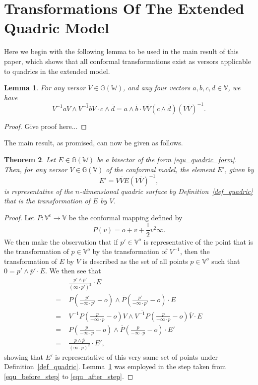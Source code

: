 \documentclass{birkjour}
\newtheorem{thm}{Theorem}[section]
\newtheorem{lem}[thm]{Lemma}
\theoremstyle{definition}
\theoremstyle{remark}
\numberwithin{equation}{section}
\newcommand{\G}{\mathbb{G}}
\newcommand{\V}{\mathbb{V}}
\newcommand{\W}{\mathbb{W}}
\newcommand{\nvao}{o}
\newcommand{\nvai}{\infty}
\begin{document}
\section{Transformations Of The Extended Quadric Model}

Here we begin with the following lemma to be used in the main result
of this paper, which shows that all conformal transformations exist
as versors applicable to quadrics in the extended model.
\begin{lem}\label{lma_versor_transfer}
For any versor $V\in\G(\W)$, and any four vectors $a,b,c,d\in\V$, we have
\begin{equation}
V^{-1}aV\wedge\overline{V^{-1}bV}\cdot c\wedge\overline{d} =
a\wedge\overline{b}\cdot V\overline{V}(c\wedge\overline{d})(V\overline{V})^{-1}.
\end{equation}
\end{lem}
\begin{proof}
Give proof here...
\end{proof}
The main result, as promised, can now be given as follows.
\begin{thm}
Let $E\in\G(\W)$ be a bivector of the form \eqref{equ_quadric_form}.
Then, for any versor $V\in\G(\V)$ of the conformal model, the element $E'$, given by
\begin{equation}
E' = V\overline{V}E(V\overline{V})^{-1},
\end{equation}
is representative of the $n$-dimensional quadric surface by Definition~\ref{def_quadric}
that is the transformation of $E$ by $V$.
\end{thm}
\begin{proof}
Let $P:\V^e\to\V$ be the conformal mapping defined by
\begin{equation}
P(v) = \nvao + v + \frac{1}{2}v^2\nvai.
\end{equation}
We then make the observation that if $p'\in\V^o$ is representative of
the point that is the transformation of $p\in\V^o$ by the transformation
of $V^{-1}$, then the transformation of $E$ by $V$ is described as the set of
all points $p\in\V^o$ such that $0=p'\wedge\overline{p}'\cdot E$.
We then see that
\begin{align}
 & \frac{p'\wedge\overline{p}'}{(\nvai\cdot p')^2}\cdot E \\
=\;& P\left(\frac{p'}{-\nvai\cdot p'}-\nvao\right)
\wedge\overline{P}\left(\frac{p'}{-\nvai\cdot p'}-\nvao\right)\cdot E \\
=\;& V^{-1}P\left(\frac{p}{-\nvai\cdot p}-\nvao\right)V
\wedge\overline{V^{-1}P}\left(\frac{p}{-\nvai\cdot p}-\nvao\right)\overline{V}\cdot E\label{equ_before_step} \\
=\;& P\left(\frac{p}{-\nvai\cdot p}-\nvao\right)\wedge
\overline{P}\left(\frac{p}{-\nvai\cdot p}-\nvao\right)\cdot E'\label{equ_after_step} \\
=\;& \frac{p\wedge\overline{p}}{(\nvai\cdot p)^2}\cdot E',
\end{align}
showing that $E'$ is representative of this very same set of
points under Definition~\ref{def_quadric}.  Lemma~\ref{lma_versor_transfer}
was employed in the step taken from \eqref{equ_before_step} to \eqref{equ_after_step}.
\end{proof}
\end{document}
